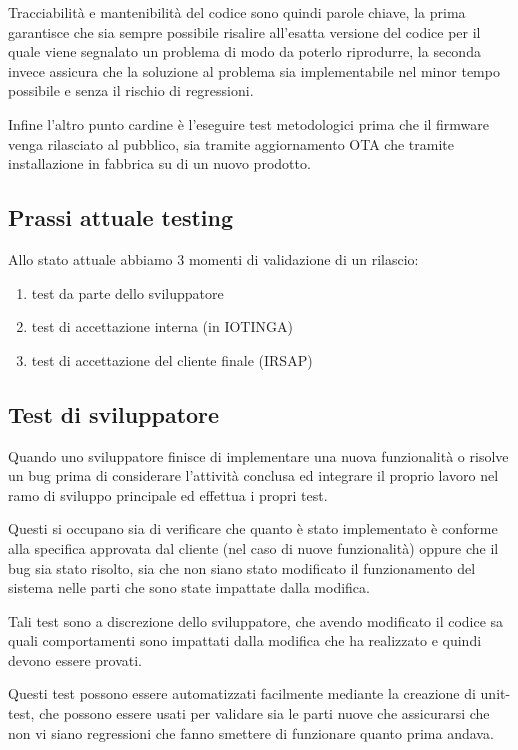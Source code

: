 \documentclass[12pt,a4paper,twoside,titlepage]{book}
\begin{document}
Tracciabilità e mantenibilità del codice sono quindi parole chiave, la prima garantisce che
sia sempre possibile risalire all'esatta versione del codice per il quale viene segnalato un
problema di modo da poterlo riprodurre, la seconda invece assicura che la soluzione al problema
sia implementabile nel minor tempo possibile e senza il rischio di regressioni.

Infine l'altro punto cardine è l'eseguire test metodologici prima che il firmware venga
rilasciato al pubblico, sia tramite aggiornamento OTA che tramite installazione in fabbrica
su di un nuovo prodotto.

\subsection{Prassi attuale testing}

Allo stato attuale abbiamo 3 momenti di validazione di un rilascio:

\begin{enumerate}
    \item test da parte dello sviluppatore
    \item test di accettazione interna (in IOTINGA)
    \item test di accettazione del cliente finale (IRSAP)
\end{enumerate}

\subsection{Test di sviluppatore}

Quando uno sviluppatore finisce di implementare una nuova funzionalità o risolve un
bug  prima di considerare l'attività conclusa ed integrare il
proprio lavoro nel ramo di sviluppo principale ed effettua i propri test.

Questi si occupano sia di verificare che quanto è stato implementato è conforme
alla specifica approvata dal cliente (nel caso di nuove funzionalità) oppure che
il bug sia stato risolto, sia che non siano stato modificato il funzionamento del sistema
nelle parti che sono state impattate dalla modifica.

Tali test sono a discrezione dello sviluppatore, che avendo modificato il codice sa
quali comportamenti sono impattati dalla modifica che ha realizzato e quindi devono essere
provati.

Questi test possono essere automatizzati facilmente mediante la creazione di unit-test, 
che possono essere usati per validare sia le parti nuove che assicurarsi che non vi siano 
regressioni che fanno smettere di funzionare quanto prima andava. 
\end{document}
